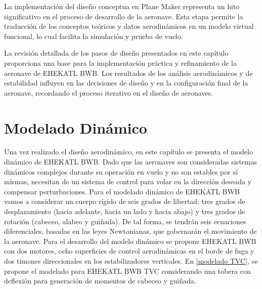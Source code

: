 La implementación del diseño conceptua en Plane Maker representa un hito significativo en el proceso de desarrollo de la aeronave. Esta etapa permite la traducción de los conceptos teóricos y datos aerodinámicos en un modelo virtual funcional, lo cual facilita la simulación y prueba de vuelo.

La revisión detallada de los pasos de diseño presentados en este capítulo proporciona una base para la implementación práctica y refinamiento de la aeronave de EHEKATL BWB. Los resultados de los análisis aerodinámicos y de estabilidad influyen en las decisiones de diseño y en la configuración final de la aeronave, recordando el proceso iterativo en el diseño de aeronaves. 















\chapter{Modelado Dinámico}

Una vez realizado el diseño aerodinámico, en este capítulo se presenta el modelo dinámico de EHEKATL BWB. 
Dado que las aeronaves son consideradas sistemas dinámicos complejos durante su operación en vuelo y no son estables por sí mismas, necesitan de un sistema de control para volar en la dirección deseada y compensar perturbaciones.
%
 Para el modelado dinámico de EHEKATL BWB vamos a considerar un cuerpo rígido de seis grados de libertad; tres grados de desplazamiento (hacia adelante, hacia un lado y hacia abajo) y tres grados de rotación (cabeceo, alabeo y guiñada).
De tal forma, se tendrán seis ecuaciones diferenciales, basadas en las leyes Newtonianas, que gobernarán el movimiento de la aeronave. 
%
Para el desarrollo del modelo dinámico se propone EHEKATL BWB con dos motores, ocho superficies de control aerodinámicas en el borde de fuga y dos timones direccionales en los estabilizadores verticales.
%
En \ref{modelado TVC}, se propone el modelado para EHEKATL BWB TVC considerando una tobera con deflexión para generación de momentos de cabeceo y guiñada. 
  
